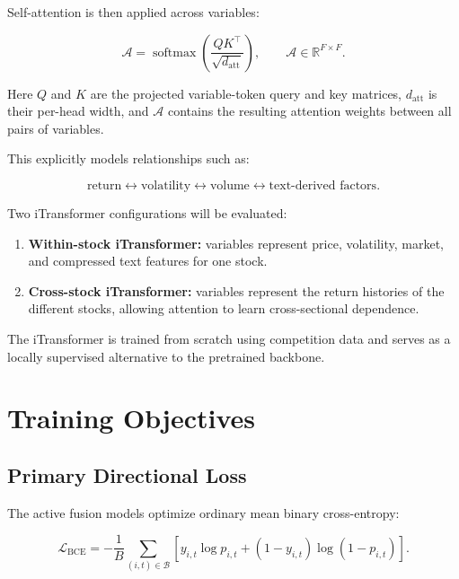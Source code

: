 \documentclass[11pt]{article}
\newcommand{\R}{\mathbb{R}}
\newcommand{\softmax}{\operatorname{softmax}}
\newcommand{\BCE}{\mathcal{L}_{\mathrm{BCE}}}
\begin{document}
Self-attention is then applied across variables:

\begin{equation}
\mathcal A
=
\softmax
\left(
\frac{QK^\top}{\sqrt{d_{\mathrm{att}}}}
\right),
\qquad
\mathcal A\in\R^{F\times F}.
\end{equation}

Here $Q$ and $K$ are the projected variable-token query and key matrices,
$d_{\mathrm{att}}$ is their per-head width, and $\mathcal A$ contains the
resulting attention weights between all pairs of variables.

This explicitly models relationships such as:

\begin{equation}
\text{return}
\leftrightarrow
\text{volatility}
\leftrightarrow
\text{volume}
\leftrightarrow
\text{text-derived factors}.
\end{equation}

Two iTransformer configurations will be evaluated:

\begin{enumerate}
    \item \textbf{Within-stock iTransformer:} variables represent price,
    volatility, market, and compressed text features for one stock.

    \item \textbf{Cross-stock iTransformer:} variables represent the return
    histories of the different stocks, allowing attention to learn
    cross-sectional dependence.
\end{enumerate}

The iTransformer is trained from scratch using competition data and serves as
a locally supervised alternative to the pretrained backbone.

\section{Training Objectives}

\subsection{Primary Directional Loss}

The active fusion models optimize ordinary mean binary cross-entropy:

\begin{equation}
\BCE
=
-
\frac{1}{B}
\sum_{(i,t)\in\mathcal B}
\left[
y_{i,t}\log p_{i,t}
+
(1-y_{i,t})\log(1-p_{i,t})
\right].
\end{equation}
\end{document}
